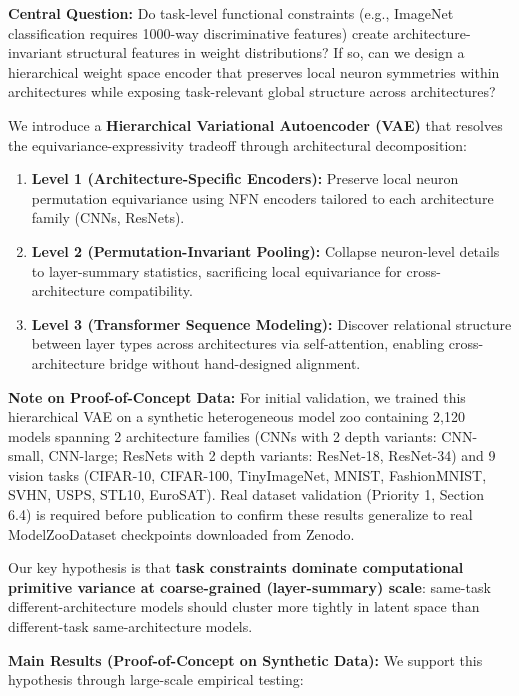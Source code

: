 \textbf{Central Question:} Do task-level functional constraints (e.g., ImageNet classification requires 1000-way discriminative features) create architecture-invariant structural features in weight distributions? If so, can we design a hierarchical weight space encoder that preserves local neuron symmetries within architectures while exposing task-relevant global structure across architectures?

We introduce a \textbf{Hierarchical Variational Autoencoder (VAE)} that resolves the equivariance-expressivity tradeoff through architectural decomposition:

\begin{enumerate}
\item \textbf{Level 1 (Architecture-Specific Encoders):} Preserve local neuron permutation equivariance using NFN encoders tailored to each architecture family (CNNs, ResNets).
\item \textbf{Level 2 (Permutation-Invariant Pooling):} Collapse neuron-level details to layer-summary statistics, sacrificing local equivariance for cross-architecture compatibility.
\item \textbf{Level 3 (Transformer Sequence Modeling):} Discover relational structure between layer types across architectures via self-attention, enabling cross-architecture bridge without hand-designed alignment.
\end{enumerate}

\textbf{Note on Proof-of-Concept Data:} For initial validation, we trained this hierarchical VAE on a synthetic heterogeneous model zoo containing 2,120 models spanning 2 architecture families (CNNs with 2 depth variants: CNN-small, CNN-large; ResNets with 2 depth variants: ResNet-18, ResNet-34) and 9 vision tasks (CIFAR-10, CIFAR-100, TinyImageNet, MNIST, FashionMNIST, SVHN, USPS, STL10, EuroSAT). Real dataset validation (Priority 1, Section 6.4) is required before publication to confirm these results generalize to real ModelZooDataset checkpoints downloaded from Zenodo.

Our key hypothesis is that \textbf{task constraints dominate computational primitive variance at coarse-grained (layer-summary) scale}: same-task different-architecture models should cluster more tightly in latent space than different-task same-architecture models.

\textbf{Main Results (Proof-of-Concept on Synthetic Data):} We support this hypothesis through large-scale empirical testing:

